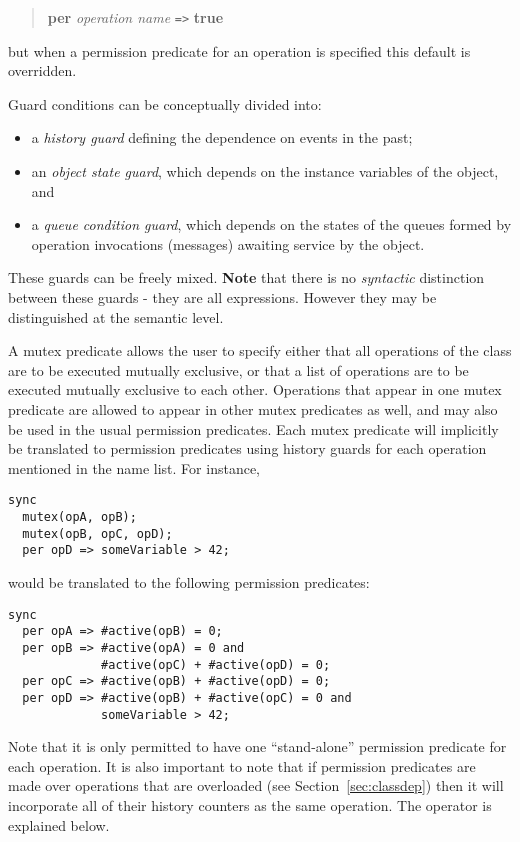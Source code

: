 \documentclass{overturerepchap}
\newcommand{\keyw}[1]{{\bf\ttfamily #1}}
\begin{document}
{\begin{description}
\begin{quote}
{\keyw{per}} {\em operation name} \texttt{=>} \keyw{true}
\end{quote}

but when a permission predicate for an operation is specified
this default is overridden.

Guard conditions can be conceptually divided into:
\begin{itemize}
\item
a {\em history guard} defining the dependence on events in the past;
\item
an {\em object state guard}, which depends on the instance variables of the
object, and
\item
a {\em queue condition guard}, which depends on the
states of the queues formed by operation invocations (messages) awaiting
service by the object.
\end{itemize}
These guards can be freely mixed. \textbf{Note} that there is no
\textit{syntactic} distinction between these guards - they are all
expressions. However they may be distinguished at the semantic level.

A mutex predicate allows the user to specify either that all
operations of the class are to be executed mutually exclusive, or that
a list of operations are to be executed mutually exclusive to each
other. Operations that appear in one mutex predicate are allowed to
appear in other mutex predicates as well, and may also be used in the
usual permission predicates. Each mutex predicate will implicitly be
translated to permission predicates using history guards for each
operation mentioned in the name list. For instance,
\begin{lstlisting}
sync
  mutex(opA, opB);
  mutex(opB, opC, opD);
  per opD => someVariable > 42;
\end{lstlisting}
would be translated to the following permission predicates:
\begin{lstlisting}
sync
  per opA => #active(opB) = 0;
  per opB => #active(opA) = 0 and
             #active(opC) + #active(opD) = 0;
  per opC => #active(opB) + #active(opD) = 0;
  per opD => #active(opB) + #active(opC) = 0 and
             someVariable > 42;
\end{lstlisting}

Note that it is only permitted to have one ``stand-alone'' permission
predicate for each operation. It is also important to note that if
permission predicates are made over operations that are overloaded
(see Section~\ref{sec:classdep}) then it will incorporate all of their history
counters as the same operation. The {\bf{}} operator
is explained below.


\end{description}}
\end{document}
